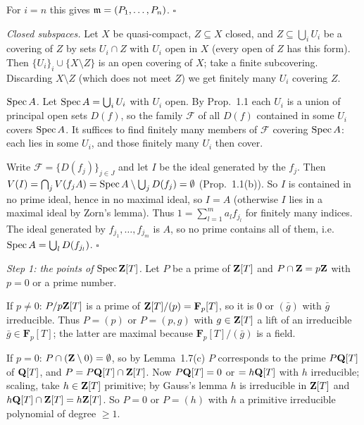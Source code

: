 \documentclass[11pt]{article}
\begin{document}
For $i=n$ this gives $\mathfrak m=(P_1,\dots,P_n)$. \hfill$\square$

\pf
\emph{Closed subspaces.} Let $X$ be quasi-compact, $Z\subseteq X$ closed, and $Z\subseteq\bigcup_{i}U_i$ be a covering of $Z$ by sets $U_i\cap Z$ with $U_i$ open in $X$ (every open of $Z$ has this form). Then $\{U_i\}_i\cup\{X\setminus Z\}$ is an open covering of $X$; take a finite subcovering. Discarding $X\setminus Z$ (which does not meet $Z$) we get finitely many $U_i$ covering $Z$.

\emph{$\operatorname{Spec} A$.} Let $\operatorname{Spec} A=\bigcup_iU_i$ with $U_i$ open. By Prop.~1.1 each $U_i$ is a union of principal open sets $D(f)$, so the family $\mathcal F$ of all $D(f)$ contained in some $U_i$ covers $\operatorname{Spec} A$. It suffices to find finitely many members of $\mathcal F$ covering $\operatorname{Spec} A$: each lies in some $U_i$, and those finitely many $U_i$ then cover.

Write $\mathcal F=\{D(f_j)\}_{j\in J}$ and let $I$ be the ideal generated by the $f_j$. Then $V(I)=\bigcap_jV(f_jA)=\operatorname{Spec} A\setminus\bigcup_jD(f_j)=\emptyset$ (Prop.~1.1(b)). So $I$ is contained in no prime ideal, hence in no maximal ideal, so $I=A$ (otherwise $I$ lies in a maximal ideal by Zorn's lemma). Thus $1=\sum_{l=1}^ma_lf_{j_l}$ for finitely many indices. The ideal generated by $f_{j_1},\dots,f_{j_m}$ is $A$, so no prime contains all of them, i.e. $\operatorname{Spec} A=\bigcup_{l}D(f_{j_l})$. \hfill$\square$

\pf
\emph{Step 1: the points of $\operatorname{Spec}\mathbf Z[T]$.} Let $P$ be a prime of $\mathbf Z[T]$ and $P\cap\mathbf Z=p\mathbf Z$ with $p=0$ or a prime number.

If $p\neq0$: $P/p\mathbf Z[T]$ is a prime of $\mathbf Z[T]/(p)=\mathbf F_p[T]$, so it is $0$ or $(\bar g)$ with $\bar g$ irreducible. Thus $P=(p)$ or $P=(p,g)$ with $g\in\mathbf Z[T]$ a lift of an irreducible $\bar g\in\mathbf F_p[T]$; the latter are maximal because $\mathbf F_p[T]/(\bar g)$ is a field.

If $p=0$: $P\cap(\mathbf Z\setminus0)=\emptyset$, so by Lemma~1.7(c) $P$ corresponds to the prime $P\mathbf Q[T]$ of $\mathbf Q[T]$, and $P=P\mathbf Q[T]\cap\mathbf Z[T]$. Now $P\mathbf Q[T]=0$ or $=h\mathbf Q[T]$ with $h$ irreducible; scaling, take $h\in\mathbf Z[T]$ primitive; by Gauss's lemma $h$ is irreducible in $\mathbf Z[T]$ and $h\mathbf Q[T]\cap\mathbf Z[T]=h\mathbf Z[T]$. So $P=0$ or $P=(h)$ with $h$ a primitive irreducible polynomial of degree $\ge1$.
\end{document}
